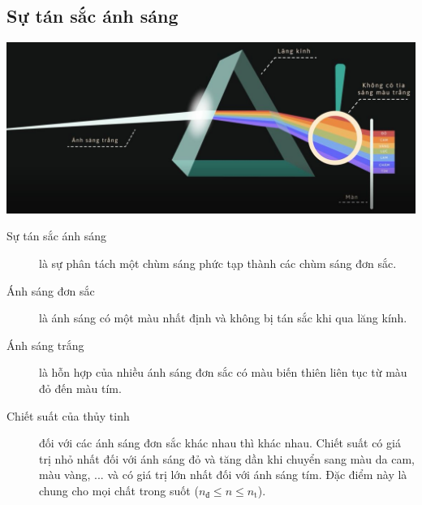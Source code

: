 \subsection{Sự tán sắc ánh sáng}
\begin{center}
	\includegraphics[width=\linewidth]{../figs/VN12-PH-32-L-019-1-3.jpg}
\end{center}

\begin{description}
	
	\item[Sự tán sắc ánh sáng] là sự phân tách một chùm sáng phức tạp thành các chùm sáng đơn sắc.
	\item[Ánh sáng đơn sắc] là ánh sáng có một màu nhất định và không bị tán sắc khi qua lăng kính.
	\item[Ánh sáng trắng] là hỗn hợp của nhiều ánh sáng đơn sắc có màu biến thiên liên tục từ màu đỏ đến màu tím. 
	\item[Chiết suất của thủy tinh] đối với các ánh sáng đơn sắc khác nhau thì khác nhau. Chiết suất có giá trị nhỏ nhất đối với ánh sáng đỏ và tăng dần khi chuyển sang màu da cam, màu vàng, ... và có giá trị lớn nhất đối với ánh sáng tím. Đặc điểm này là chung cho mọi chất trong suốt ($n_{\text{đ}}\leq n \leq  n_{\text{t}} $).
\end{description}
	









	

